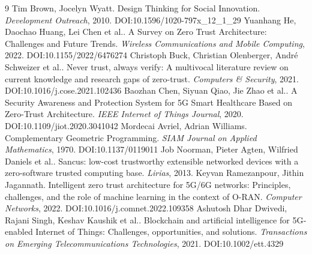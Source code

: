 \documentclass[11pt]{article}
\begin{document}
\begin{thebibliography}{9}
 Tim Brown, Jocelyn Wyatt. Design Thinking for Social Innovation. \emph{Development Outreach}, 2010. DOI:10.1596/1020-797x\_12\_1\_29
 Yuanhang He, Daochao Huang, Lei Chen et al.. A Survey on Zero Trust Architecture: Challenges and Future Trends. \emph{Wireless Communications and Mobile Computing}, 2022. DOI:10.1155/2022/6476274
 Christoph Buck, Christian Olenberger, André Schweizer et al.. Never trust, always verify: A multivocal literature review on current knowledge and research gaps of zero-trust. \emph{Computers \& Security}, 2021. DOI:10.1016/j.cose.2021.102436
 Baozhan Chen, Siyuan Qiao, Jie Zhao et al.. A Security Awareness and Protection System for 5G Smart Healthcare Based on Zero-Trust Architecture. \emph{IEEE Internet of Things Journal}, 2020. DOI:10.1109/jiot.2020.3041042
 Mordecai Avriel, Adrian Williams. Complementary Geometric Programming. \emph{SIAM Journal on Applied Mathematics}, 1970. DOI:10.1137/0119011
 Job Noorman, Pieter Agten, Wilfried Daniels et al.. Sancus: low-cost trustworthy extensible networked devices with a zero-software trusted computing base. \emph{Lirias}, 2013. 
 Keyvan Ramezanpour, Jithin Jagannath. Intelligent zero trust architecture for 5G/6G networks: Principles, challenges, and the role of machine learning in the context of O-RAN. \emph{Computer Networks}, 2022. DOI:10.1016/j.comnet.2022.109358
 Ashutosh Dhar Dwivedi, Rajani Singh, Keshav Kaushik et al.. Blockchain and artificial intelligence for 5G‐enabled Internet of Things: Challenges, opportunities, and solutions. \emph{Transactions on Emerging Telecommunications Technologies}, 2021. DOI:10.1002/ett.4329
\end{thebibliography}
\end{document}
